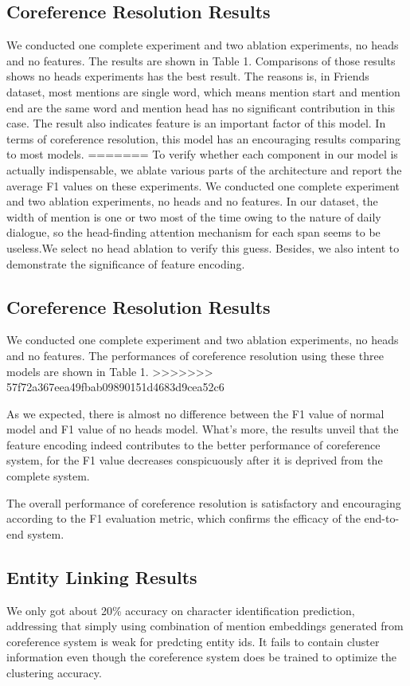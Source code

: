 \documentclass[11pt]{article}
\begin{document}
\subsection{Coreference Resolution Results}
We conducted one complete experiment and two ablation experiments, no heads and no features. The results are shown in Table 1. Comparisons of those results shows no heads experiments has the best result. The reasons is, in Friends dataset, most mentions are single word, which means mention start and mention end are the same word and mention head has no significant contribution in this case. The result also indicates feature is an important factor of this model. In terms of coreference resolution, this model has an encouraging results comparing to most models.
=======
To verify whether each component in our model is actually indispensable, we ablate various parts of the architecture and report the average F1 values on these experiments. We conducted one complete experiment and two ablation experiments, no heads and no features. In our dataset, the width of mention is one or two most of the time owing to the nature of daily dialogue, so the head-finding attention mechanism for each span seems to be useless.We select no head ablation to verify this guess. Besides, we also intent to demonstrate the significance of feature encoding.

\subsection{Coreference Resolution Results}
We conducted one complete experiment and two ablation experiments, no heads and no features. The performances of coreference resolution using these three models are shown in Table 1. 
>>>>>>> 57f72a367eea49fbab09890151d4683d9cea52c6

As we expected, there is almost no difference between the F1 value of normal model and F1 value of no heads model. What's more, the results unveil that the feature encoding indeed contributes to the better performance of coreference system, for the F1 value decreases conspicuously after it is deprived from the complete system. 

The overall performance of coreference resolution is satisfactory and encouraging according to the F1 evaluation metric, which confirms the efficacy of the end-to-end system.

\subsection{Entity Linking Results}
We only got about 20\% accuracy on character identification prediction, addressing that simply using combination of mention embeddings generated from coreference system is weak for predcting entity ids. It fails to contain cluster information even though the coreference system does be trained to optimize the clustering accuracy. 
\end{document}
